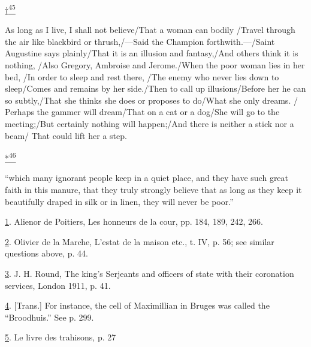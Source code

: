 \protect\hypertarget{23_NOTES.xhtmlux5cux23id_2652}{\protect\hyperlink{18_Chapter_Eleven__THE_FORMS_OF_THO.xhtmlux5cux23id_2651}{†\textsuperscript{45}}}
As long as I live, I shall not believe/That a woman can bodily /Travel
through the air like blackbird or thrush,/---Said the Champion
forthwith.---/Saint Augustine says plainly/That it is an illusion and
fantasy,/And others think it is nothing, /Also Gregory, Ambroise and
Jerome./When the poor woman lies in her bed, /In order to sleep and rest
there, /The enemy who never lies down to sleep/Comes and remains by her
side./Then to call up illusions/Before her he can so subtly,/That she
thinks she does or proposes to do/What she only dreams. / Perhaps the
gammer will dream/That on a cat or a dog/She will go to the meeting;/But
certainly nothing will happen;/And there is neither a stick nor a beam/
That could lift her a step.

\protect\hypertarget{23_NOTES.xhtmlux5cux23id_2654}{\protect\hyperlink{18_Chapter_Eleven__THE_FORMS_OF_THO.xhtmlux5cux23id_2653}{*\textsuperscript{46}}}
``which many ignorant people keep in a quiet place, and they have such
great faith in this manure, that they truly strongly believe that as
long as they keep it beautifully draped in silk or in linen, they will
never be poor.''

\protect\hypertarget{23_NOTES.xhtmlux5cux23id_630}{\protect\hyperlink{18_Chapter_Eleven__THE_FORMS_OF_THO.xhtmlux5cux23id_629}{1}}.
Alienor de Poitiers, Les honneurs de la cour, pp. 184, 189, 242, 266.

\protect\hypertarget{23_NOTES.xhtmlux5cux23id_628}{\protect\hyperlink{18_Chapter_Eleven__THE_FORMS_OF_THO.xhtmlux5cux23id_627}{2}}.
Olivier de la Marche, L'estat de la maison etc., t. IV, p. 56; see
similar questions above, p. 44.

\protect\hypertarget{23_NOTES.xhtmlux5cux23id_626}{\protect\hyperlink{18_Chapter_Eleven__THE_FORMS_OF_THO.xhtmlux5cux23id_625}{3}}.
J. H. Round, The king's Serjeants and officers of state with their
coronation services, London 1911, p. 41.

\protect\hypertarget{23_NOTES.xhtmlux5cux23id_624}{\protect\hyperlink{18_Chapter_Eleven__THE_FORMS_OF_THO.xhtmlux5cux23id_623}{4}}.
{[}Trans.{]} For instance, the cell of Maximillian in Bruges was called
the ``Broodhuis.'' See p. 299.

\protect\hypertarget{23_NOTES.xhtmlux5cux23id_622}{\protect\hyperlink{18_Chapter_Eleven__THE_FORMS_OF_THO.xhtmlux5cux23id_621}{5}}.
Le livre des trahisons, p. 27

